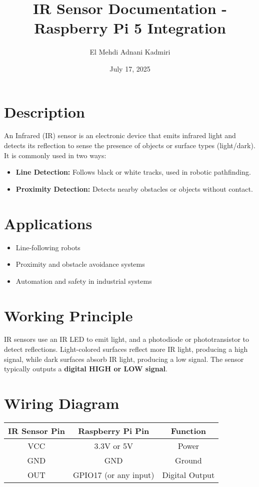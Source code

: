 \documentclass{article}
\title{IR Sensor Documentation - Raspberry Pi 5 Integration}
\author{El Mehdi Adnani Kadmiri}
\date{July 17, 2025}
\begin{document}
	
	\maketitle
	
	\section{Description}
	An Infrared (IR) sensor is an electronic device that emits infrared light and detects its reflection to sense the presence of objects or surface types (light/dark). It is commonly used in two ways:
	\begin{itemize}
		\item \textbf{Line Detection:} Follows black or white tracks, used in robotic pathfinding.
		\item \textbf{Proximity Detection:} Detects nearby obstacles or objects without contact.
	\end{itemize}
	
	\section{Applications}
	\begin{itemize}
		\item Line-following robots
		\item Proximity and obstacle avoidance systems
		\item Automation and safety in industrial systems
	\end{itemize}
	
	\section{Working Principle}
	IR sensors use an IR LED to emit light, and a photodiode or phototransistor to detect reflections. Light-colored surfaces reflect more IR light, producing a high signal, while dark surfaces absorb IR light, producing a low signal. The sensor typically outputs a \textbf{digital HIGH or LOW signal}.
	
	\section{Wiring Diagram}
	\begin{center}
		\begin{tabular}{|c|c|c|}
			\hline
			\textbf{IR Sensor Pin} & \textbf{Raspberry Pi Pin} & \textbf{Function} \\
			\hline
			VCC & 3.3V or 5V & Power \\
			GND & GND & Ground \\
			OUT & GPIO17 (or any input) & Digital Output \\
			\hline
		\end{tabular}
	\end{center}
	
\end{document}
